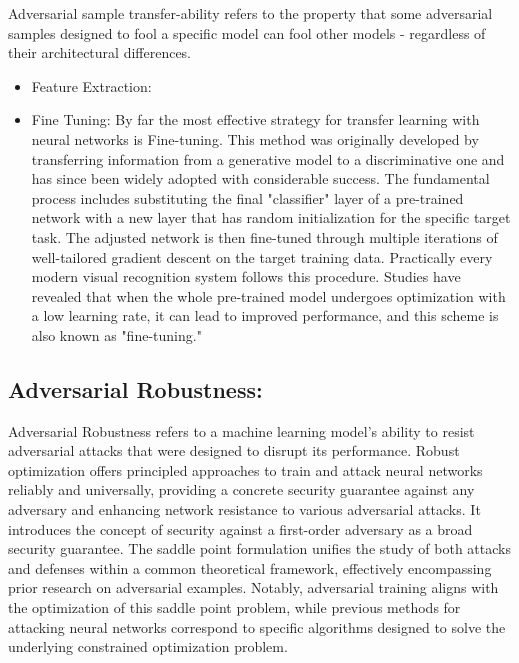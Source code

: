 \documentclass{article}
\begin{document}
\setlength{\parskip}{10pt}
\begingroup
\raggedright
Adversarial sample transfer-ability refers to the property that some adversarial samples designed to fool a specific model can fool other models - regardless of their architectural differences. \cite{goodfellow2015explaining}
\endgroup

\begin{itemize}
    \item
Feature Extraction:
		
\item
Fine Tuning:
By far the most effective strategy for transfer learning with neural networks is Fine-tuning.\cite{oquab2014learning} This method was originally developed by transferring information from a generative model to a discriminative one and has since been widely adopted with considerable success. The fundamental process includes substituting the final "classifier" layer of a pre-trained network with a new layer that has random initialization for the specific target task. The adjusted network is then fine-tuned through multiple iterations of well-tailored gradient descent on the target training data. Practically every modern visual recognition system follows this procedure. \cite{wang2019growing}
Studies have revealed that when the whole pre-trained model undergoes optimization with a low learning rate, it can lead to improved performance, and this scheme is also known as "fine-tuning." \cite{chin2021renofeation}
\end{itemize}

\subsection{Adversarial Robustness:} 
Adversarial Robustness refers to a machine learning model’s ability to resist adversarial attacks that were designed to disrupt its performance. 
Robust optimization offers principled approaches to train and attack neural networks reliably and universally, providing a concrete security guarantee against any adversary and enhancing network resistance to various adversarial attacks. It introduces the concept of security against a first-order adversary as a broad security guarantee. The saddle point formulation unifies the study of both attacks and defenses within a common theoretical framework, effectively encompassing prior research on adversarial examples. Notably, adversarial training aligns with the optimization of this saddle point problem, while previous methods for attacking neural networks correspond to specific algorithms designed to solve the underlying constrained optimization problem. \cite{madry2017towards}
\end{document}
